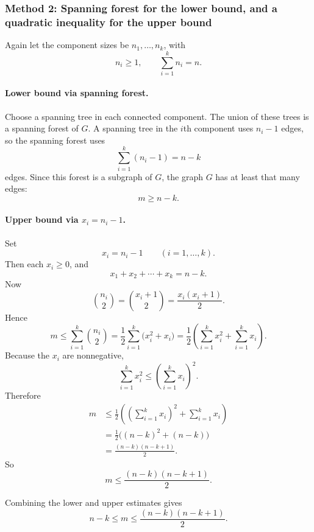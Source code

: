 \documentclass[12pt]{article}
\begin{document}
\subsubsection{Method 2: Spanning forest for the lower bound, and a quadratic inequality for the upper bound}
Again let the component sizes be \(n_1,\dots,n_k\), with
\[
n_i\ge 1,\qquad \sum_{i=1}^k n_i=n.
\]

\paragraph{Lower bound via spanning forest.}
Choose a spanning tree in each connected component. The union of these trees is a spanning forest of \(G\). A spanning tree in the \(i\)th component uses \(n_i-1\) edges, so the spanning forest uses
\[
\sum_{i=1}^k (n_i-1)=n-k
\]
edges. Since this forest is a subgraph of \(G\), the graph \(G\) has at least that many edges:
\[
\boxed{m\ge n-k.}
\]

\paragraph{Upper bound via \(x_i=n_i-1\).}
Set
\[
x_i=n_i-1\qquad (i=1,\dots,k).
\]
Then each \(x_i\ge 0\), and
\[
x_1+x_2+\cdots+x_k=n-k.
\]
Now
\[
\binom{n_i}{2}=\binom{x_i+1}{2}=\frac{x_i(x_i+1)}{2}.
\]
Hence
\[
m\le \sum_{i=1}^k \binom{n_i}{2}
=\frac12\sum_{i=1}^k \bigl(x_i^2+x_i\bigr)
=\frac12\left(\sum_{i=1}^k x_i^2+\sum_{i=1}^k x_i\right).
\]
Because the \(x_i\) are nonnegative,
\[
\sum_{i=1}^k x_i^2 \le \left(\sum_{i=1}^k x_i\right)^2.
\]
Therefore
\begin{align*}
m
&\le \frac12\left(\left(\sum_{i=1}^k x_i\right)^2+\sum_{i=1}^k x_i\right)\\
&=\frac12\bigl((n-k)^2+(n-k)\bigr)\\
&=\frac{(n-k)(n-k+1)}{2}.
\end{align*}
So
\[
\boxed{m\le \frac{(n-k)(n-k+1)}{2}.}
\]

Combining the lower and upper estimates gives
\[
\boxed{n-k \le m \le \frac{(n-k)(n-k+1)}{2}.}
\]
\end{document}
